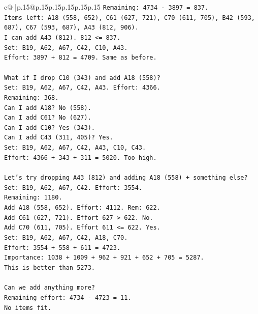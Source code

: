 \documentclass{article}
\begin{document}
{\begin{supertabular}{c@{$\;$}|p{.15\linewidth}@{}p{.15\linewidth}p{.15\linewidth}p{.15\linewidth}p{.15\linewidth}p{.15\linewidth}}
{{{\texttt{Remaining: 4734 {-} 3897 = 837.} \\
\texttt{Items left: A18 (558, 652), C61 (627, 721), C70 (611, 705), B42 (593, 687), C67 (593, 687), A43 (812, 906).} \\
\texttt{I can add A43 (812). 812 <= 837.} \\
\texttt{Set: B19, A62, A67, C42, C10, A43.} \\
\texttt{Effort: 3897 + 812 = 4709. Same as before.} \\
\\ 
\texttt{What if I drop C10 (343) and add A18 (558)?} \\
\texttt{Set: B19, A62, A67, C42, A43. Effort: 4366.} \\
\texttt{Remaining: 368.} \\
\texttt{Can I add A18? No (558).} \\
\texttt{Can I add C61? No (627).} \\
\texttt{Can I add C10? Yes (343).} \\
\texttt{Can I add C43 (311, 405)? Yes.} \\
\texttt{Set: B19, A62, A67, C42, A43, C10, C43.} \\
\texttt{Effort: 4366 + 343 + 311 = 5020. Too high.} \\
\\ 
\texttt{Let's try dropping A43 (812) and adding A18 (558) + something else?} \\
\texttt{Set: B19, A62, A67, C42. Effort: 3554.} \\
\texttt{Remaining: 1180.} \\
\texttt{Add A18 (558, 652). Effort: 4112. Rem: 622.} \\
\texttt{Add C61 (627, 721). Effort 627 > 622. No.} \\
\texttt{Add C70 (611, 705). Effort 611 <= 622. Yes.} \\
\texttt{Set: B19, A62, A67, C42, A18, C70.} \\
\texttt{Effort: 3554 + 558 + 611 = 4723.} \\
\texttt{Importance: 1038 + 1009 + 962 + 921 + 652 + 705 = 5287.} \\
\texttt{This is better than 5273.} \\
\\ 
\texttt{Can we add anything more?} \\
\texttt{Remaining effort: 4734 {-} 4723 = 11.} \\
\texttt{No items fit.} \\
\\ 
}}}
\end{supertabular}}
\end{document}

